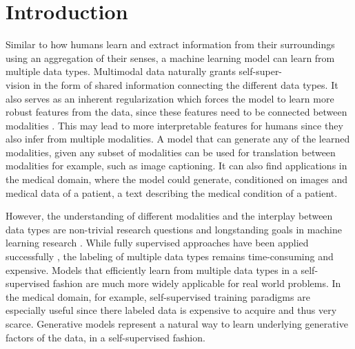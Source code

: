 \chapter{Introduction}
Similar to how humans learn and extract information from their surroundings using an aggregation of their senses, a machine learning model can learn from multiple data types.
Multimodal data naturally grants self-super-\\vision in the form of shared information connecting the different data types.
It also serves as an inherent regularization which forces the model to learn more robust features from the data, since these features need to be connected between modalities \citep{baltrusaitis_multimodal_2019}.
This may lead to more interpretable features for humans since they also infer from multiple modalities.
A model that can generate any of the learned modalities, given any subset of modalities can be used for translation between modalities for example, such as image captioning.
It can also find applications in the medical domain, where the model could generate, conditioned on images and medical data of a patient, a text describing the medical condition of a patient.

However, the understanding of different modalities and the interplay between data types are non-trivial research questions and longstanding goals in machine learning research \citep{ngiam_multimodal_nodate}.
While fully supervised approaches have been applied successfully \citep{karpathy_deep_2015,tsai_learning_2018}, the labeling of multiple data types remains time-consuming and expensive.
Models that efficiently learn from multiple data types in a self-supervised fashion are much more widely applicable for real world problems.
In the medical domain, for example, self-supervised training paradigms are especially useful since there labeled data is expensive to acquire and thus very scarce.
Generative models represent a natural way to learn underlying generative factors of the data, in a self-supervised fashion.



